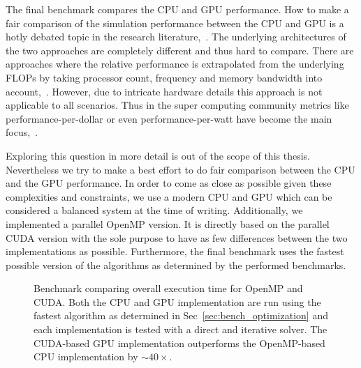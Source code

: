 The final benchmark compares the CPU and GPU performance. How to make a fair comparison of the simulation performance between the CPU and GPU is a hotly debated topic in the research literature,~\cite{Gregg2011}\cite{Lee2010}. The underlying architectures of the two approaches are completely different and thus hard to compare. There are approaches where the relative performance is extrapolated from the underlying FLOPs by taking processor count, frequency and memory bandwidth into account,~\cite{Lee2010}. However, due to intricate hardware details this approach is not applicable to all scenarios. Thus in the super computing community metrics like performance-per-dollar or even performance-per-watt have become the main focus,~\cite{Kamil2008}.

Exploring this question in more detail is out of the scope of this thesis. Nevertheless we try to make a best effort to do fair comparison between the CPU and the GPU performance. In order to come as close as possible given these complexities and constraints, we use a modern CPU and GPU which can be considered a balanced system at the time of writing. Additionally, we implemented a parallel OpenMP version. It is directly based on the parallel CUDA version with the sole purpose to have as few differences between the two implementations as possible. Furthermore, the final benchmark uses the fastest possible version of the algorithms as determined by the performed benchmarks.

\begin{figure}[htbp]
  \centering
  \caption[Benchmark overall execution time.]{Benchmark comparing overall execution time for OpenMP and CUDA. Both the CPU and GPU implementation are run using the fastest algorithm as determined in Sec~\ref{sec:bench_optimization} and each implementation is tested with a direct and iterative solver. The CUDA-based GPU implementation outperforms the OpenMP-based CPU implementation by ${\sim}40×$.}
  \label{fig:overall}
\end{figure}

